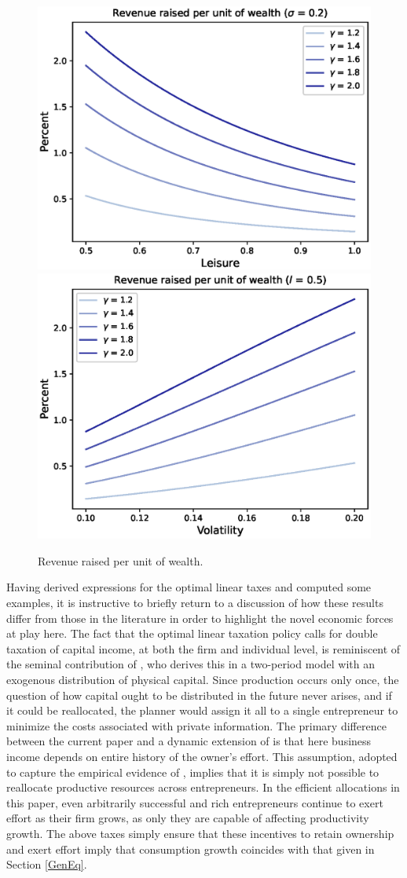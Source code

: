 \documentclass[11pt]{article}
\theoremstyle{plain}
\begin{document}
\begin{figure}[!htb]
\centering
\includegraphics[width=0.49\linewidth]{rev_lgrid}
\includegraphics[width=0.49\linewidth]{rev_sig_grid}
\caption{Revenue raised per unit of wealth.}\label{fig:rev}
\end{figure}

Having derived expressions for the optimal linear taxes and computed some examples, it is instructive to briefly return to a discussion of how these results differ from those in the literature in order to highlight the novel economic forces at play here. The fact that the optimal linear taxation policy calls for double taxation of capital income, at both the firm and individual level, is reminiscent of the seminal contribution of \cite{albanesi_optimal_2006}, who derives this in a two-period model with an exogenous distribution of physical capital. Since production occurs only once, the question of how capital ought to be distributed in the future never arises, and if it could be reallocated, the planner would assign it all to a single entrepreneur to minimize the costs associated with private information. The primary difference between the current paper and a dynamic extension of \cite{albanesi_optimal_2006} is that here business income depends on entire history of the owner's effort. This assumption, adopted to capture the empirical evidence of \cite{smith_capitalists_2019}, implies that it is simply not possible to reallocate productive resources across entrepreneurs. In the efficient allocations in this paper, even arbitrarily successful and rich entrepreneurs continue to exert effort as their firm grows, as only they are capable of affecting productivity growth. The above taxes simply ensure that these incentives to retain ownership and exert effort imply that consumption growth coincides with that given in Section \ref{GenEq}. 
\end{document}
